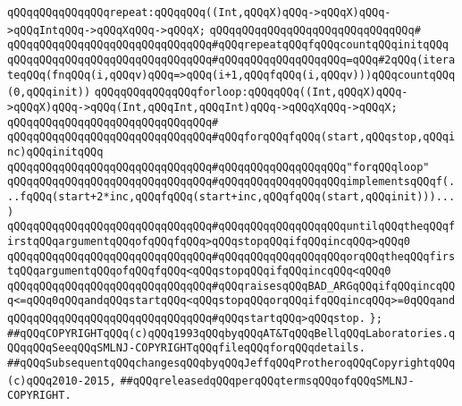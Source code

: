 \newline
\verb|qQQqqQQqqQQqqQQqrepeat:qQQqqQQq((Int,qQQqX)qQQq->qQQqX)qQQq->qQQqIntqQQq->qQQqXqQQq->qQQqX;|\newline
\verb|qQQqqQQqqQQqqQQqqQQqqQQqqQQqqQQq#|\newline
\verb|qQQqqQQqqQQqqQQqqQQqqQQqqQQqqQQq#qQQqrepeatqQQqfqQQqcountqQQqinitqQQq|\newline
\verb|qQQqqQQqqQQqqQQqqQQqqQQqqQQqqQQq#qQQqqQQqqQQqqQQqqQQq=qQQq#2qQQq(iterateqQQq(fnqQQq(i,qQQqv)qQQq=>qQQq(i+1,qQQqfqQQq(i,qQQqv)))qQQqcountqQQq(0,qQQqinit))|\newline
\newline
\verb|qQQqqQQqqQQqqQQqforloop:qQQqqQQq((Int,qQQqX)qQQq->qQQqX)qQQq->qQQq(Int,qQQqInt,qQQqInt)qQQq->qQQqXqQQq->qQQqX;|\newline
\verb|qQQqqQQqqQQqqQQqqQQqqQQqqQQqqQQq#|\newline
\verb|qQQqqQQqqQQqqQQqqQQqqQQqqQQqqQQq#qQQqforqQQqfqQQq(start,qQQqstop,qQQqinc)qQQqinitqQQq|\newline
\verb|qQQqqQQqqQQqqQQqqQQqqQQqqQQqqQQq#qQQqqQQqqQQqqQQqqQQq"forqQQqloop"|\newline
\verb|qQQqqQQqqQQqqQQqqQQqqQQqqQQqqQQq#qQQqqQQqqQQqqQQqqQQqimplementsqQQqf(...fqQQq(start+2*inc,qQQqfqQQq(start+inc,qQQqfqQQq(start,qQQqinit)))...)|\newline
\verb|qQQqqQQqqQQqqQQqqQQqqQQqqQQqqQQq#qQQqqQQqqQQqqQQqqQQquntilqQQqtheqQQqfirstqQQqargumentqQQqofqQQqfqQQq>qQQqstopqQQqifqQQqincqQQq>qQQq0|\newline
\verb|qQQqqQQqqQQqqQQqqQQqqQQqqQQqqQQq#qQQqqQQqqQQqqQQqqQQqorqQQqtheqQQqfirstqQQqargumentqQQqofqQQqfqQQq<qQQqstopqQQqifqQQqincqQQq<qQQq0|\newline
\verb|qQQqqQQqqQQqqQQqqQQqqQQqqQQqqQQq#qQQqraisesqQQqBAD_ARGqQQqifqQQqincqQQq<=qQQq0qQQqandqQQqstartqQQq<qQQqstopqQQqorqQQqifqQQqincqQQq>=0qQQqand|\newline
\verb|qQQqqQQqqQQqqQQqqQQqqQQqqQQqqQQq#qQQqstartqQQq>qQQqstop.|\newline
\verb|};|\newline
\newline
\newline
\verb|##qQQqCOPYRIGHTqQQq(c)qQQq1993qQQqbyqQQqAT&TqQQqBellqQQqLaboratories.qQQqqQQqSeeqQQqSMLNJ-COPYRIGHTqQQqfileqQQqforqQQqdetails.|\newline
\verb|##qQQqSubsequentqQQqchangesqQQqbyqQQqJeffqQQqProtheroqQQqCopyrightqQQq(c)qQQq2010-2015,|\newline
\verb|##qQQqreleasedqQQqperqQQqtermsqQQqofqQQqSMLNJ-COPYRIGHT.|\newline

